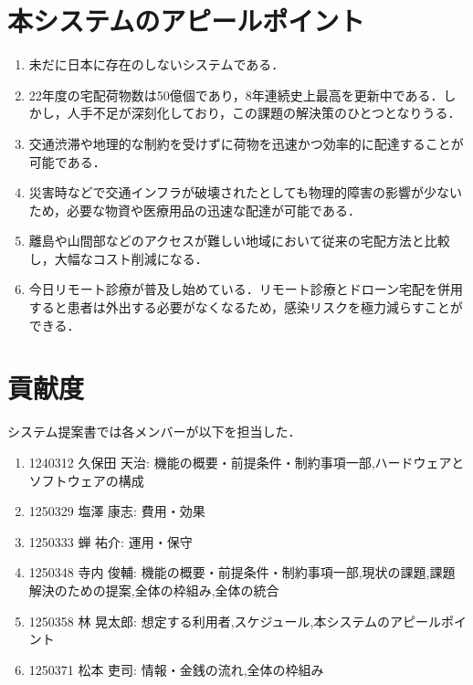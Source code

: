 \documentclass[a4paper, titlepage]{jsarticle}
\begin{document}
\section{本システムのアピールポイント}
\begin{enumerate}
        \item 未だに日本に存在のしないシステムである．
        \item 22年度の宅配荷物数は50億個であり，8年連続史上最高を更新中である．しかし，人手不足が深刻化しており，この課題の解決策のひとつとなりうる．
        \item 交通渋滞や地理的な制約を受けずに荷物を迅速かつ効率的に配達することが可能である．
        \item 災害時などで交通インフラが破壊されたとしても物理的障害の影響が少ないため，必要な物資や医療用品の迅速な配達が可能である．
        \item 離島や山間部などのアクセスが難しい地域において従来の宅配方法と比較し，大幅なコスト削減になる．
        \item 今日リモート診療が普及し始めている．リモート診療とドローン宅配を併用すると患者は外出する必要がなくなるため，感染リスクを極力減らすことができる．
\end{enumerate}

\section{貢献度}
システム提案書では各メンバーが以下を担当した．
\begin{enumerate}
    \item 1240312 久保田 天治: 機能の概要・前提条件・制約事項一部,ハードウェアとソフトウェアの構成
    \item 1250329 塩澤 康志: 費用・効果
    \item 1250333 蝉 祐介: 運用・保守
    \item 1250348 寺内 俊輔: 機能の概要・前提条件・制約事項一部,現状の課題,課題解決のための提案,全体の枠組み,全体の統合
    \item 1250358 林 晃太郎: 想定する利用者,スケジュール,本システムのアピールポイント
    \item 1250371 松本 吏司: 情報・金銭の流れ,全体の枠組み
\end{enumerate}



\end{document}
